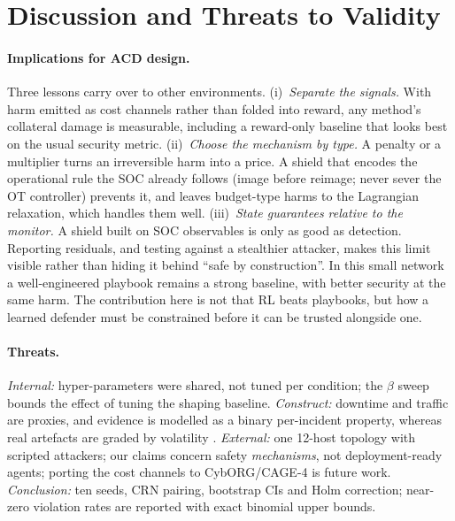 \documentclass[10pt]{article}
\begin{document}

\section{Discussion and Threats to Validity}
\paragraph{Implications for ACD design.}
Three lessons carry over to other environments.
(i)~\emph{Separate the signals.} With harm emitted as cost channels rather
than folded into reward, any method's collateral damage is measurable,
including a reward-only baseline that looks best on the usual security
metric.
(ii)~\emph{Choose the mechanism by type.} A penalty or a multiplier turns an
irreversible harm into a price. A shield that encodes the operational rule
the SOC already follows (image before reimage; never sever the OT
controller) prevents it, and leaves budget-type harms to the Lagrangian
relaxation, which handles them well.
(iii)~\emph{State guarantees relative to the monitor.} A shield built on SOC
observables is only as good as detection. Reporting residuals, and testing
against a stealthier attacker, makes this limit visible rather than hiding it
behind ``safe by construction''.
In this small network a well-engineered playbook remains a strong baseline,
with better security at the same harm. The contribution here is not that RL
beats playbooks, but how a learned defender must be constrained before it
can be trusted alongside one.

\paragraph{Threats.}
\emph{Internal:} hyper-parameters were shared, not tuned per condition; the
$\beta$ sweep bounds the effect of tuning the shaping baseline.
\emph{Construct:} downtime and traffic are proxies, and evidence is modelled
as a binary per-incident property, whereas real artefacts are graded by
volatility \citep{rfc3227}. \emph{External:} one 12-host topology with
scripted attackers; our claims concern safety \emph{mechanisms}, not
deployment-ready agents; porting the cost channels to CybORG/CAGE-4 is future
work. \emph{Conclusion:} ten seeds, CRN pairing, bootstrap CIs and Holm
correction; near-zero violation rates are reported with exact binomial upper
bounds.
\end{document}
